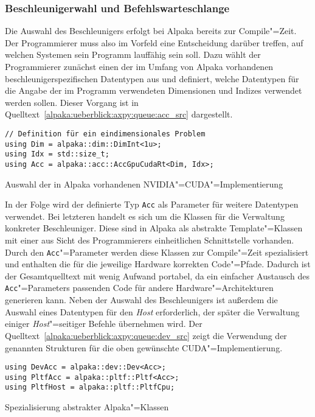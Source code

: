 \subsubsection{Beschleunigerwahl und Befehlswarteschlange}
\label{alpaka:ueberblick:axpy:queue}

Die Auswahl des Beschleunigers erfolgt bei Alpaka bereits zur Compile"=Zeit. Der
Programmierer muss also im Vorfeld eine Entscheidung darüber treffen, auf
welchen Systemen sein Programm lauffähig sein soll. Dazu wählt der Programmierer
zunächst einen der im Umfang von Alpaka vorhandenen beschleunigerspezifischen
Datentypen aus und definiert, welche Datentypen für die Angabe der im Programm
verwendeten Dimensionen und Indizes verwendet werden sollen. Dieser Vorgang ist
in Quelltext~\ref{alpaka:ueberblick:axpy:queue:acc_src} dargestellt.

\begin{code}
    \begin{verbatim}
// Definition für ein eindimensionales Problem
using Dim = alpaka::dim::DimInt<1u>;
using Idx = std::size_t;
using Acc = alpaka::acc::AccGpuCudaRt<Dim, Idx>;
    \end{verbatim}
    \caption{Auswahl der in Alpaka vorhandenen NVIDIA"=CUDA"=Implementierung}
    \label{alpaka:ueberblick:axpy:queue:acc_src}
\end{code}

In der Folge wird der definierte Typ \texttt{Acc} als Parameter für weitere
Datentypen verwendet. Bei letzteren handelt es sich um die Klassen für die
Verwaltung konkreter Beschleuniger. Diese sind in Alpaka als abstrakte
Template"=Klassen mit einer aus Sicht des Programmierers einheitlichen
Schnittstelle vorhanden. Durch den \texttt{Acc}"=Parameter werden diese Klassen
zur Compile"=Zeit spezialisiert und enthalten die für die jeweilige Hardware
korrekten Code"=Pfade. Dadurch ist der Gesamtquelltext mit wenig Aufwand
portabel, da ein einfacher Austausch des \texttt{Acc}"=Parameters passenden Code
für andere Hardware"=Architekturen generieren kann. Neben der Auswahl des
Beschleunigers ist außerdem die Auswahl eines Datentypen für den
\textit{Host} erforderlich, der später die Verwaltung einiger
\textit{Host}"=seitiger Befehle übernehmen wird. Der
Quelltext~\ref{alpaka:ueberblick:axpy:queue:dev_src} zeigt die Verwendung der
genannten Strukturen für die oben gewünschte CUDA"=Implementierung.

\begin{code}
    \begin{verbatim}
using DevAcc = alpaka::dev::Dev<Acc>;
using PltfAcc = alpaka::pltf::Pltf<Acc>;
using PltfHost = alpaka::pltf::PltfCpu;
    \end{verbatim}
    \caption{Spezialisierung abstrakter Alpaka"=Klassen}
    \label{alpaka:ueberblick:axpy:queue:dev_src}
\end{code}

